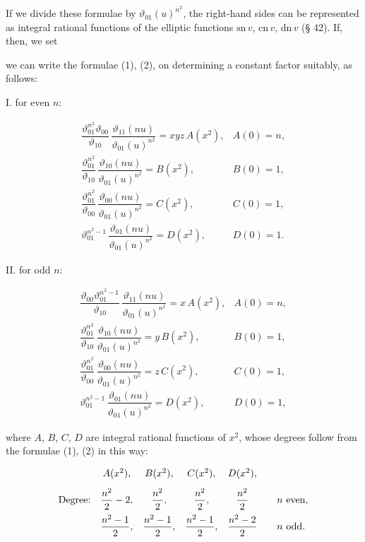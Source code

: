 
If we divide these formulae by $\vartheta_{01}(u)^{n^2}$, the
right-hand sides can be represented as integral rational functions
of the elliptic functions $\mathrm{sn}\,v$, $\mathrm{cn}\,v$,
$\mathrm{dn}\,v$ (§ 42). If, then, we set


we can write the formulae (1), (2), on determining a constant
factor suitably, as follows:

I. for even $n$:

\[
\begin{array}{ll}
\dfrac{\vartheta_{01}^{n^2}\vartheta_{00}}{\vartheta_{10}}\,\dfrac{\vartheta_{11}(nu)}{\vartheta_{01}(u)^{n^2}} = xyz\,A(x^2), & A(0)=n,\\[3mm]
\dfrac{\vartheta_{01}^{n^2}}{\vartheta_{10}}\,\dfrac{\vartheta_{10}(nu)}{\vartheta_{01}(u)^{n^2}} = B(x^2), & B(0)=1,\\[3mm]
\dfrac{\vartheta_{01}^{n^2}}{\vartheta_{00}}\,\dfrac{\vartheta_{00}(nu)}{\vartheta_{01}(u)^{n^2}} = C(x^2), & C(0)=1,\\[3mm]
\vartheta_{01}^{n^2-1}\,\dfrac{\vartheta_{01}(nu)}{\vartheta_{01}(u)^{n^2}} = D(x^2), & D(0)=1.
\end{array}
\]

II. for odd $n$:

\[
\begin{array}{ll}
\dfrac{\vartheta_{00}\vartheta_{01}^{n^2-1}}{\vartheta_{10}}\,\dfrac{\vartheta_{11}(nu)}{\vartheta_{01}(u)^{n^2}} = x\,A(x^2), & A(0)=n,\\[3mm]
\dfrac{\vartheta_{01}^{n^2}}{\vartheta_{10}}\,\dfrac{\vartheta_{10}(nu)}{\vartheta_{01}(u)^{n^2}} = y\,B(x^2), & B(0)=1,\\[3mm]
\dfrac{\vartheta_{01}^{n^2}}{\vartheta_{00}}\,\dfrac{\vartheta_{00}(nu)}{\vartheta_{01}(u)^{n^2}} = z\,C(x^2), & C(0)=1,\\[3mm]
\vartheta_{01}^{n^2-1}\,\dfrac{\vartheta_{01}(nu)}{\vartheta_{01}(u)^{n^2}} = D(x^2), & D(0)=1,
\end{array}
\]

where $A$, $B$, $C$, $D$ are integral rational functions of $x^2$,
whose degrees follow from the formulae (1), (2) in this way:

\[
\begin{array}{c@{\quad}cccc@{\qquad}l}
 & A(x^2), & B(x^2), & C(x^2), & D(x^2), & \\[3mm]
\text{Degree:} & \dfrac{n^2}{2}-2, & \dfrac{n^2}{2}, & \dfrac{n^2}{2}, & \dfrac{n^2}{2} & n \text{ even,}\\[3mm]
 & \dfrac{n^2-1}{2}, & \dfrac{n^2-1}{2}, & \dfrac{n^2-1}{2}, & \dfrac{n^2-2}{2} & n \text{ odd.}
\end{array}
\]


